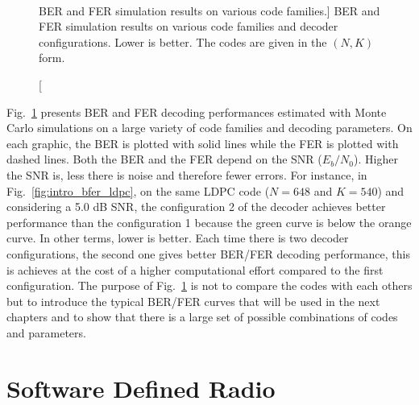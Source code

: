 \begin{figure}[htp]
  \centering
     \quad{}
    \quad{}
    \\
      \quad{}
   \quad{}
  \caption
    [BER and FER simulation results on various code families.]
    {BER and FER simulation results on various code families and decoder
    configurations. Lower is better. The codes are given in the $(N,K)$ form.}
  \label{fig:intro_bfer}
\end{figure}

Fig.~\ref{fig:intro_bfer} presents BER and FER decoding performances estimated
with Monte Carlo simulations on a large variety of code families and decoding
parameters. On each graphic, the BER is plotted with solid lines while the FER
is plotted with dashed lines. Both the BER and the FER depend on the SNR
($E_b/N_0$). Higher the SNR is, less there is noise and therefore fewer errors.
For instance, in Fig.~\ref{fig:intro_bfer_ldpc}, on the same LDPC code
($N = 648$ and $K = 540$) and considering a 5.0 dB SNR, the configuration 2 of
the decoder achieves better performance than the configuration 1 because the
{\color{Paired-3} green} curve is below the {\color{Paired-7} orange} curve. In
other terms, lower is better. Each time there is two decoder configurations, the
second one gives better BER/FER decoding performance, this is achieves at the
cost of a higher computational effort compared to the first configuration.
The purpose of Fig.~\ref{fig:intro_bfer} is not to compare the codes with each
others but to introduce the typical BER/FER curves that will be used in the next
chapters and to show that there is a large set of possible combinations of codes
and parameters.

\section{Software Defined Radio}


